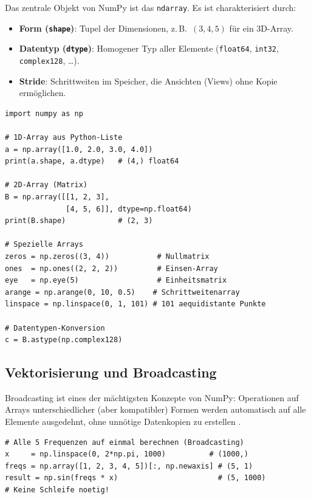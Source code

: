 \documentclass[12pt, a4paper]{article}
\begin{document}
Das zentrale Objekt von NumPy ist das \texttt{ndarray}. Es ist
charakterisiert durch:

\begin{itemize}
  \item \textbf{Form (\texttt{shape})}: Tupel der Dimensionen, z.\,B.\ $(3, 4, 5)$ für ein 3D-Array.
  \item \textbf{Datentyp (\texttt{dtype})}: Homogener Typ aller Elemente (\texttt{float64}, \texttt{int32}, \texttt{complex128}, \ldots).
  \item \textbf{Stride}: Schrittweiten im Speicher, die Ansichten (Views) ohne Kopie ermöglichen.
\end{itemize}

\begin{lstlisting}[caption={Erstellen und Inspizieren von NumPy-Arrays}]
import numpy as np

# 1D-Array aus Python-Liste
a = np.array([1.0, 2.0, 3.0, 4.0])
print(a.shape, a.dtype)   # (4,) float64

# 2D-Array (Matrix)
B = np.array([[1, 2, 3],
              [4, 5, 6]], dtype=np.float64)
print(B.shape)            # (2, 3)

# Spezielle Arrays
zeros = np.zeros((3, 4))           # Nullmatrix
ones  = np.ones((2, 2, 2))         # Einsen-Array
eye   = np.eye(5)                  # Einheitsmatrix
arange = np.arange(0, 10, 0.5)    # Schrittweitenarray
linspace = np.linspace(0, 1, 101) # 101 aequidistante Punkte

# Datentypen-Konversion
c = B.astype(np.complex128)
\end{lstlisting}

\subsection{Vektorisierung und Broadcasting}
\label{subsec:numpy-broadcast}

Broadcasting ist eines der mächtigsten Konzepte von NumPy: Operationen
auf Arrays unterschiedlicher (aber kompatibler) Formen werden automatisch
auf alle Elemente ausgedehnt, ohne unnötige Datenkopien zu erstellen
\cite{vanderplas2016python}.

\begin{lstlisting}[caption={Broadcasting: Elementweise Operationen}]
# Alle 5 Frequenzen auf einmal berechnen (Broadcasting)
x     = np.linspace(0, 2*np.pi, 1000)          # (1000,)
freqs = np.array([1, 2, 3, 4, 5])[:, np.newaxis] # (5, 1)
result = np.sin(freqs * x)                       # (5, 1000)
# Keine Schleife noetig!
\end{lstlisting}
\end{document}
